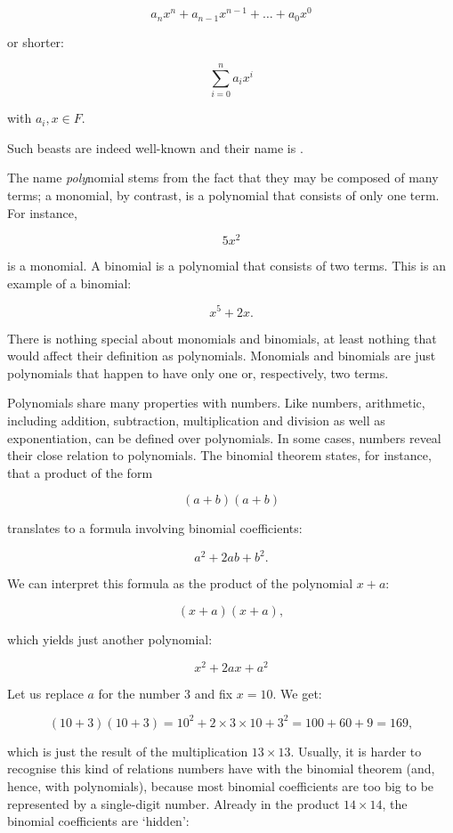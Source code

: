 \documentclass[tikz]{scrreprt}
\begin{document}
\[
a_nx^n + a_{n-1}x^{n-1} + \dots + a_0x^0
\]

or shorter:

\[
\sum_{i=0}^n{a_ix^i}
\]

with $a_i, x \in F$.

Such beasts are indeed well-known
and their name is .

The name \emph{poly}nomial stems from the fact
that they may be composed of many terms;
a monomial, by contrast, is a polynomial 
that consists of only one term.
For instance,

\[
5x^2
\]

is a monomial. A binomial is a polynomial
that consists of two terms. This is
an example of a binomial:

\[
x^5 + 2x.
\]

There is nothing special about
monomials and binomials, at least nothing
that would affect their definition as polynomials.
Monomials and binomials are just
polynomials that happen to have only
one or, respectively, two terms.

Polynomials share many properties with numbers.
Like numbers, arithmetic, including
addition, subtraction, multiplication and division
as well as exponentiation, can be defined over polynomials. 
In some cases, numbers reveal their close relation
to polynomials. The binomial theorem states,
for instance, that a product of the form 

\[
(a+b)(a+b)
\]

translates to a formula involving binomial coefficients:

\[
a^2 + 2ab + b^2.
\]

We can interpret this formula as the product 
of the polynomial $x+a$:

\[
(x+a)(x+a),
\]

which yields just another polynomial:

\[
x^2 + 2ax + a^2
\]

Let us replace $a$ for the number 3
and fix $x=10$. We get:

\begin{equation}
(10+3)(10+3) = 10^2 + 2\times 3\times 10 + 3^2 = 100 + 60 + 9 = 169,
\end{equation}

which is just the result of the multiplication $13\times 13$.
Usually, it is harder to recognise this kind of relations 
numbers have with the binomial theorem (and, hence, with polynomials),
because most binomial coefficients are too big to be represented
by a single-digit number. Already in the product $14\times 14$,
the binomial coefficients are `hidden':
\end{document}
